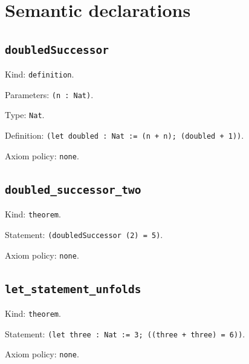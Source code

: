 \documentclass[11pt]{article}
\begin{document}
\section*{Semantic declarations}
\subsection*{\texttt{doubledSuccessor}}
\noindent Kind: \texttt{definition}.\par
\noindent Parameters: \texttt{(n : Nat)}.\par
\noindent Type: \texttt{Nat}.\par
\noindent Definition: \texttt{(let doubled : Nat := (n + n); (doubled + 1))}.\par
\noindent Axiom policy: \texttt{none}.\par
\subsection*{\texttt{doubled\_successor\_two}}
\noindent Kind: \texttt{theorem}.\par
\noindent Statement: \texttt{(doubledSuccessor (2) = 5)}.\par
\noindent Axiom policy: \texttt{none}.\par
\subsection*{\texttt{let\_statement\_unfolds}}
\noindent Kind: \texttt{theorem}.\par
\noindent Statement: \texttt{(let three : Nat := 3; ((three + three) = 6))}.\par
\noindent Axiom policy: \texttt{none}.\par
\end{document}
